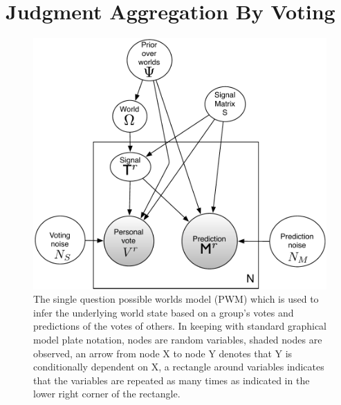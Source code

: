 \documentclass{report}
\theoremstyle{definition}
\begin{document}
\chapter{Judgment Aggregation By Voting}
\begin{figure}[H]
    \centering
    \includegraphics[width=\textwidth]{basic_generative_votes_updated.pdf}
    \caption{The single question possible worlds model (PWM) which is used to infer the underlying world state based on a group’s votes and predictions of the votes of others. In keeping with standard graphical model plate notation, nodes are random variables, shaded nodes are observed, an arrow from node X to node Y denotes that Y is conditionally dependent on X, a rectangle around variables indicates that the variables are repeated as many times as indicated in the lower right corner of the rectangle.}
    \label{fig:pwmsingle}
\end{figure}
\end{document}
